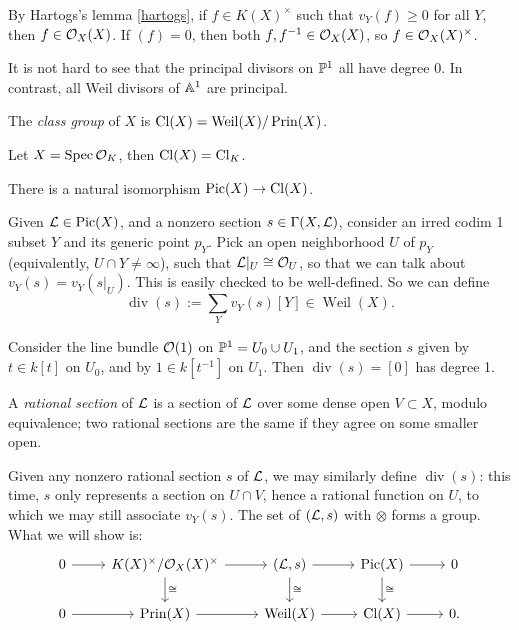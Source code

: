\documentclass[11pt]{amsart}
\begin{document}
By Hartogs's lemma \ref{hartogs}, if $f\in K(X)^\times$ such that $v_Y(f)\ge 0$ for all $Y$, then $f\in \cO_X(X)$. If $(f) = 0$, then both $f,f^{-1}\in \cO_X(X)$, so $f\in \cO_X(X)^\times$.

It is not hard to see that the principal divisors on $\PP^1$ all have degree 0. In contrast, all Weil divisors of $\AA^1$ are principal. 

\begin{defn}
    The \emph{class group} of $X$ is $\Cl(X) = \operatorname{Weil}(X)/\operatorname{Prin}(X)$.
\end{defn}

\begin{exm}
    Let $X = \Spec \cO_K$, then $\Cl(X) = \Cl_K$.
\end{exm}

\begin{thm}
\label{Pic=Cl}
    There is a natural isomorphism $\Pic(X)\to \Cl(X)$.
\end{thm}

Given $\cL\in \Pic(X)$, and a nonzero section $s\in \Gamma(X, \cL)$, consider an irred codim 1 subset $Y$ and its generic point $p_Y$. Pick an open neighborhood $U$ of $p_Y$ (equivalently, $U\cap Y \neq \infty$), such that $\cL|_U \cong \cO_U$, so that we can talk about $v_Y(s) = v_Y(s|_U)$. This is easily checked to be well-defined. So we can define
\[\operatorname{div}(s) := \sum_Y v_Y(s)[Y]\in \operatorname{Weil}(X).\]

\begin{exm}
    Consider the line bundle $\cO(1)$ on $\PP^1 = U_0\cup U_1$, and the section $s$ given by $t\in k[t]$ on $U_0$, and by $1\in k[t^{-1}]$ on $U_1$. Then $\operatorname{div}(s) = [0]$ has degree 1.
\end{exm}

\begin{defn}
    A \emph{rational section} of $\cL$ is a section of $\cL$ over some dense open $V\subset X$, modulo equivalence; two rational sections are the same if they agree on some smaller open.
\end{defn}

Given any nonzero rational section $s$ of $\cL$, we may similarly define $\operatorname{div}(s)$: this time, $s$ only represents a section on $U\cap V$, hence a rational function on $U$, to which we may still associate $v_Y(s)$. The set of $(\cL,s)$ with $\otimes$ forms a group. What we will show is:
\[
\begin{tikzcd}
    0 \arrow[r] & K(X)^\times/\cO_X(X)^\times \arrow[r] \arrow[d, "\cong"] & (\cL, s) \arrow[r] \arrow[d, "\cong"] & \Pic(X) \arrow[r] \arrow[d, "\cong"] & 0 \\
    0 \arrow[r] & \operatorname{Prin}(X) \arrow[r] & \operatorname{Weil}(X) \arrow[r] & \Cl(X) \arrow[r] & 0.
\end{tikzcd}
\]
\end{document}
